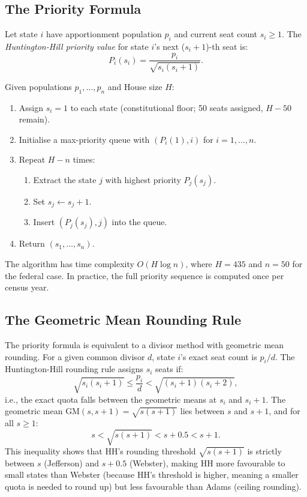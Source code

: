 \label{sec:definition}

\subsection{The Priority Formula}

\begin{definition}
  Let state $i$ have apportionment population $p_i$ and current seat
  count $s_i \geq 1$.
  The \emph{Huntington-Hill priority value} for state $i$'s next
  ($s_i+1$)-th seat is:
  \[
    P_i(s_i) = \frac{p_i}{\sqrt{s_i(s_i+1)}}.
  \]
\end{definition}

\begin{definition}
  Given populations $p_1, \ldots, p_n$ and House size $H$:
  \begin{enumerate}
    \item Assign $s_i = 1$ to each state (constitutional floor;
      50 seats assigned, $H - 50$ remain).
    \item Initialise a max-priority queue with $(P_i(1), i)$
      for $i = 1, \ldots, n$.
    \item Repeat $H - n$ times:
      \begin{enumerate}
        \item Extract the state $j$ with highest priority $P_j(s_j)$.
        \item Set $s_j \leftarrow s_j + 1$.
        \item Insert $(P_j(s_j), j)$ into the queue.
      \end{enumerate}
    \item Return $(s_1, \ldots, s_n)$.
  \end{enumerate}
\end{definition}

The algorithm has time complexity $O(H \log n)$,
where $H = 435$ and $n = 50$ for the federal case.
In practice, the full priority sequence is computed once per census year.

\subsection{The Geometric Mean Rounding Rule}

The priority formula is equivalent to a divisor method with geometric
mean rounding.
For a given common divisor $d$, state $i$'s exact seat count is $p_i/d$.
The Huntington-Hill rounding rule assigns $s_i$ seats if:
\[
  \sqrt{s_i(s_i+1)} \leq \frac{p_i}{d} < \sqrt{(s_i+1)(s_i+2)},
\]
i.e., the exact quota falls between the geometric means at $s_i$ and
$s_i+1$.
The geometric mean $\text{GM}(s, s+1) = \sqrt{s(s+1)}$ lies between
$s$ and $s+1$, and for all $s \geq 1$:
\[
  s < \sqrt{s(s+1)} < s + 0.5 < s + 1.
\]
This inequality shows that HH's rounding threshold $\sqrt{s(s+1)}$
is strictly between $s$ (Jefferson) and $s+0.5$ (Webster),
making HH more favourable to small states than Webster
(because HH's threshold is higher, meaning a smaller quota is needed
to round up) but less favourable than Adams (ceiling rounding).

